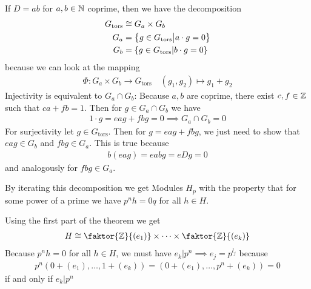 If $D = a b$ for $a,b \in \mathbb{N}$ coprime, then we have the decomposition
\begin{align*}
	G_{\text{tors}} &\cong G_a \times G_b\\
	G_a &= \left\{g \in G_{\text{tors}} \big\vert a \cdot g = 0\right\}\\
	G_b &= \left\{g \in G_{\text{tors}}| b \cdot g = 0\right\}
\end{align*}
because we can look at the mapping
\begin{align*}
	\Phi: G_a \times G_b \to G_{\text{tors}} \quad (g_1,g_2) \mapsto g_1 + g_2
\end{align*}
Injectivity is equivalent to $G_a \cap G_b$: Because $a,b$ are coprime, there exist $c,f \in \mathbb{Z}$ such that $ca + fb = 1$.
Then for $g \in G_a \cap G_b$ we have
\begin{align*}
	1 \cdot g = e a g + fb g = 0 \implies G_a \cap G_b = 0
\end{align*}
For surjectivity let $g \in G_{\text{tors}}$. Then for $g = eag + fbg$, we just need to show that $eag \in G_b$ and $fbg \in G_a$.
This is true because
\begin{align*}
	b (eag) = eabg = eDg = 0
\end{align*}
and analogously for $fbg \in G_a$.

By iterating this decomposition we get Modules $H_p$ with the property that for some power of a prime we have $p^{n} h = 0 q$ for all $h \in H$.

Using the first part of the theorem we get
\begin{align*}
	H \iso \faktor{\Z}{(e_1)} \times \dots \times \faktor{\Z}{(e_k)}	
\end{align*}
Because $p^{n}h = 0$ for all $h \in H$, we must have $e_k | p^{n} \implies e_j = p^{l_j}$ because \begin{align*}
	p^{n}\left(
		0 + (e_1), \ldots, 1 + (e_k)
	\right) 
	=
	\left(
		0 + (e_1), \ldots, p^{n} + (e_k)
	\right) = 0
\end{align*}
if and only if $e_k |p^{n}$





